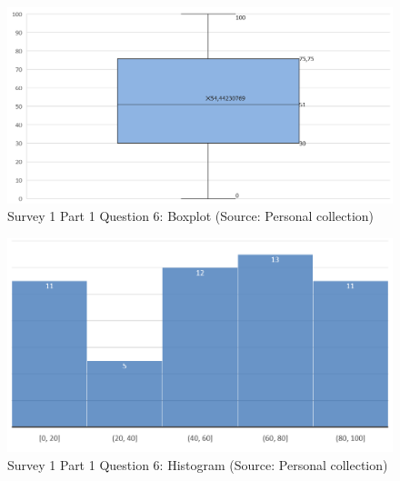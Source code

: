 \documentclass[a4paper,10pt,twoside]{article}
\begin{document}
\vspace{0.3cm}
\begin{figure}[hbt!] 
\begin{center}
\includegraphics[width=13cm]{../surveys/analyzed_data/survey1_part1_question6_boxplot.png} 
\caption[Survey 1 Part 1 Question 6: Boxplot]{Survey 1 Part 1 Question 6: Boxplot (Source: Personal collection)}
\label{fig:survey1_part1_question6_boxplot}
\end{center}
\end{figure}

\vspace{0.3cm}
\begin{figure}[hbt!] 
\begin{center}
\includegraphics[width=14cm]{../surveys/analyzed_data/survey1_part1_question6_histogram.png} 
\caption[Survey 1 Part 1 Question 6: Histogram]{Survey 1 Part 1 Question 6: Histogram (Source: Personal collection)}
\label{fig:survey1_part1_question6_histogram}
\end{center}
\end{figure}
\end{document}
